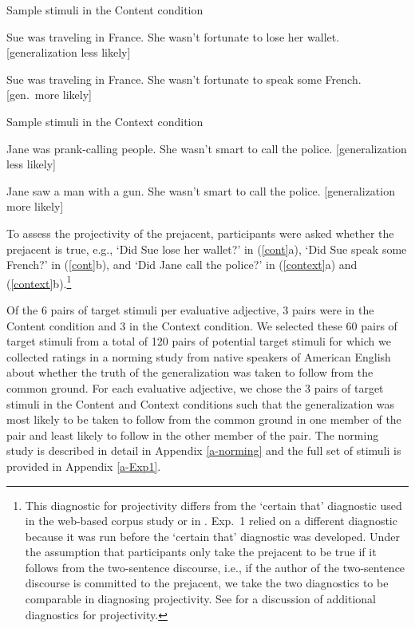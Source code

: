 \documentclass[11pt,fleqn]{article}
\newcommand{\6}{\mbox{$[\hspace*{-.6mm}[$}}
\newcommand{\9}{\mbox{$]\hspace*{-.6mm}]$}}
\begin{document}
\begin{exe}
\ex\label{cont} Sample stimuli in the Content condition 

\begin{xlist}
\ex Sue was traveling in France. She wasn't fortunate to lose her wallet.  \hfill [generalization less likely]

\ex Sue was traveling in France. She wasn't fortunate to speak some French. \hfill [gen.\ more likely]
\end{xlist}

\ex\label{context} Sample stimuli in the Context condition

\begin{xlist}
\ex Jane was prank-calling people. She wasn't smart to call the police. \hfill [generalization less likely]

\ex Jane saw a man with a gun. She wasn't smart to call the police. \hfill [generalization more likely]
\end{xlist}
\end{exe}
To assess the projectivity of the prejacent, participants were asked whether the prejacent is true, e.g., `Did Sue lose her wallet?' in (\ref{cont}a), `Did Sue speak some French?' in (\ref{cont}b), and `Did Jane call the police?' in (\ref{context}a) and (\ref{context}b).\footnote{This diagnostic for projectivity differs from the `certain that' diagnostic used in the web-based corpus study or in \citealt{tbd-variability}. Exp.~1 relied on a different diagnostic because it was run before the `certain that' diagnostic was developed. Under the assumption that participants only take the prejacent to be true if it follows from the two-sentence discourse, i.e., if the author of the two-sentence discourse is committed to the prejacent, we take the two diagnostics to be comparable in diagnosing projectivity. See \citealt{tbd-variability} for a discussion of additional diagnostics for projectivity.}

Of the 6 pairs of target stimuli per evaluative adjective, 3 pairs were in the Content condition and 3 in the Context condition. We selected these 60 pairs of target stimuli from a total of 120 pairs of potential target stimuli for which we collected ratings in a norming study from native speakers of American English about whether the truth of the generalization was taken to follow from the common ground. For each evaluative adjective, we chose the 3 pairs of target stimuli in the Content and Context conditions such that the generalization was most likely to be taken to follow from the common ground in one member of the pair and least likely to follow in the other member of the pair. The norming study is described in detail in Appendix \ref{a-norming} and the full set of stimuli is provided in Appendix \ref{a-Exp1}.
\end{document}
